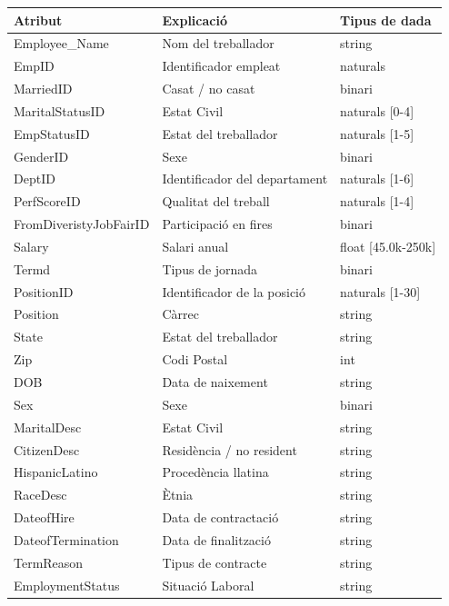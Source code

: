 \documentclass[a4paper, 11pt]{article}
\begin{document}
\begin{table}[h]
    \centering
    \begin{tabular}{l|l|l}
        \textbf{Atribut} & \textbf{Explicació} & \textbf{Tipus de dada}\\\hline\hline
        Employee\_Name & Nom del treballador & string\\\hline
        EmpID &  Identificador empleat & naturals\\\hline
        MarriedID & Casat / no casat & binari\\\hline
        MaritalStatusID & Estat Civil & naturals [0-4]\\\hline
        EmpStatusID & Estat del treballador & naturals [1-5]\\\hline
        GenderID & Sexe & binari \\\hline
        DeptID & Identificador del departament & naturals [1-6]\\\hline
        PerfScoreID & Qualitat del treball & naturals [1-4] \\\hline
        FromDiveristyJobFairID & Participació en fires & binari\\\hline
        Salary & Salari anual & float [45.0k-250k] \\\hline
        Termd & Tipus de jornada & binari\\\hline
        PositionID & Identificador de la posició & naturals [1-30]\\\hline
        Position & Càrrec & string\\\hline
        State & Estat del treballador & string\\\hline
        Zip & Codi Postal & int\\\hline
        DOB & Data de naixement & string\\\hline
        Sex & Sexe & binari\\\hline
        MaritalDesc & Estat Civil & string  \\\hline
        CitizenDesc & Residència / no resident & string\\\hline
        HispanicLatino & Procedència llatina & string\\\hline
        RaceDesc & Ètnia & string\\\hline
        DateofHire & Data de contractació & string\\\hline
        DateofTermination & Data de finalització & string\\\hline
        TermReason & Tipus de contracte & string\\\hline
        EmploymentStatus & Situació Laboral & string\\\hline

\end{tabular}
\end{table}
\end{document}
